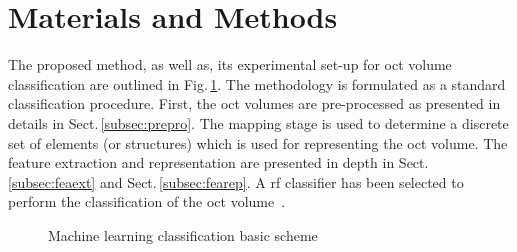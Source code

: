 \graphicspath{ {./content/method/figures/}}

\section{Materials and Methods}

The proposed method, as well as, its experimental set-up for \ac{oct} volume classification are outlined in Fig.\,\ref{fig:ML-scheme}.
The methodology is formulated as a standard classification procedure.
First, the \ac{oct} volumes are pre-processed as presented in details in Sect.\,\ref{subsec:prepro}.
The mapping stage is used to determine a discrete set of elements (or structures) which is used for representing the \ac{oct} volume.
The feature extraction and representation are presented in depth in Sect.\,\ref{subsec:feaext} and Sect.\,\ref{subsec:fearep}.
A \ac{rf} classifier has been selected to perform the classification of the \ac{oct} volume~\cite{breiman2001random}.



\begin{figure}[h]
  \caption{Machine learning classification basic scheme}
  \label{fig:ML-scheme}
\end{figure}

